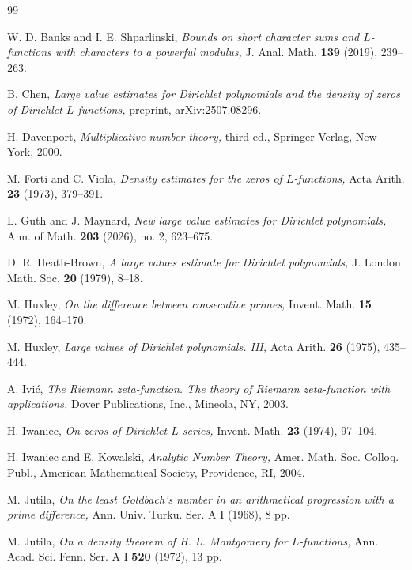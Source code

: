 \documentclass[12pt]{amsart}
\theoremstyle{definition}
\theoremstyle{plain}
\theoremstyle{remark}
\numberwithin{equation}{section}
\numberwithin{theorem}{section}
\numberwithin{equation}{section}
\begin{document}
	\begin{thebibliography}{99}  
		
		W. D. Banks and I. E. Shparlinski, \emph{Bounds on short character sums and $L$-functions with characters to a powerful modulus,} J. Anal. Math. \textbf{139} (2019), 239--263.
		
		B. Chen, \emph{Large value estimates for Dirichlet polynomials and the density
			of zeros of Dirichlet $L$-functions,} preprint,
		arXiv:2507.08296.
		
		 H. Davenport, \emph{Multiplicative number theory,}  third ed., Springer-Verlag, New York, 2000.
		
		 M. Forti and C. Viola,  \emph{Density estimates for the zeros of $L$-functions,} Acta Arith.  \textbf{23} (1973),  379--391. 
		
		L. Guth and J. Maynard, \emph{New large value estimates for Dirichlet polynomials,}
		Ann. of Math. \textbf{203} (2026), no. 2, 623--675.
		
		 D. R. Heath-Brown, \emph{A large values estimate for Dirichlet polynomials,} J. London Math. Soc. \textbf{20} (1979), 8--18.
		
		 M. Huxley,  \emph{On the difference between consecutive primes,} Invent. Math. \textbf{15} (1972),  164--170. 
		
		 M. Huxley, \emph{Large values of Dirichlet polynomials. III,} Acta Arith.  \textbf{26} (1975),  435--444. 
		
		 A. Ivi\'{c},  \emph{The Riemann zeta-function. The theory of Riemann zeta-function with applications,} Dover Publications, Inc., Mineola, NY, 2003.
		
		H. Iwaniec, \emph{On zeros of Dirichlet $L$-series,}
		Invent. Math. \textbf{23} (1974), 97--104.
		
		H. Iwaniec and E. Kowalski, \emph{Analytic Number Theory,}
		Amer. Math. Soc. Colloq. Publ., American Mathematical Society, Providence, RI, 2004.
		
		 M. Jutila,  \emph{On the least Goldbach's number in an arithmetical progression with a prime difference,} Ann. Univ. Turku. Ser. A I (1968), 8 pp.
		
		 M. Jutila,  \emph{On a density theorem of H. L. Montgomery for $L$-functions,} Ann. Acad. Sci. Fenn. Ser. A I \textbf{520} (1972), 13 pp. 
		

\end{thebibliography}
\end{document}
